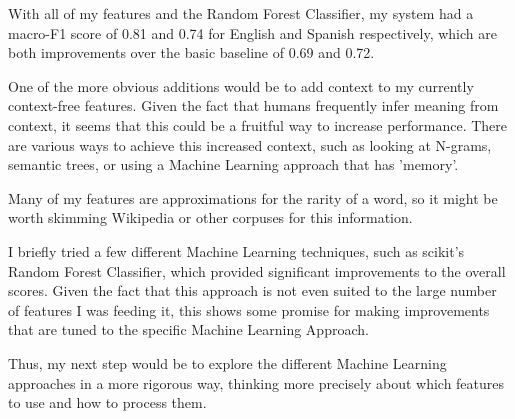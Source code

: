 \documentclass[11pt]{article}
\begin{document}
With all of my features and the Random Forest Classifier, my system had a macro-F1 score of 0.81 and 0.74 for English and Spanish respectively, which are both improvements over the basic baseline of 0.69 and 0.72.

One of the more obvious additions would be to add context to my currently context-free features. Given the fact that humans frequently infer meaning from context, it seems that this could be a fruitful way to increase performance. There are various ways to achieve this increased context, such as looking at N-grams, semantic trees, or using a Machine Learning approach that has 'memory'.


Many of my features are approximations for the rarity of a word, so it might be worth skimming Wikipedia or other corpuses for this information.


I briefly tried a few different Machine Learning techniques, such as scikit's Random Forest Classifier, which provided significant improvements to the overall scores. Given the fact that this approach is not even suited to the large number of features I was feeding it, this shows some promise for making improvements that are tuned to the specific Machine Learning Approach. 

Thus, my next step would be to explore the different Machine Learning approaches in a more rigorous way, thinking more precisely about which features to use and how to process them.
\end{document}
